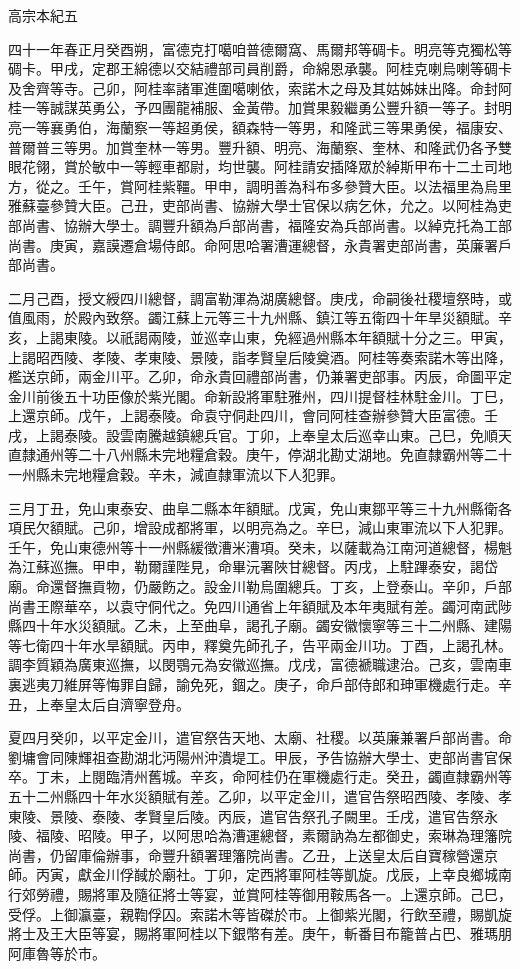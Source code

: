 
\begin{pinyinscope}
高宗本紀五

四十一年春正月癸酉朔，富德克打噶咱普德爾窩、馬爾邦等碉卡。明亮等克獨松等碉卡。甲戌，定郡王綿德以交結禮部司員削爵，命綿恩承襲。阿桂克喇烏喇等碉卡及舍齊等寺。己卯，阿桂率諸軍進圍噶喇依，索諾木之母及其姑姊妹出降。命封阿桂一等誠謀英勇公，予四團龍補服、金黃帶。加賞果毅繼勇公豐升額一等子。封明亮一等襄勇伯，海蘭察一等超勇侯，額森特一等男，和隆武三等果勇侯，福康安、普爾普三等男。加賞奎林一等男。豐升額、明亮、海蘭察、奎林、和隆武仍各予雙眼花翎，賞於敏中一等輕車都尉，均世襲。阿桂請安插降眾於綽斯甲布十二土司地方，從之。壬午，賞阿桂紫韁。甲申，調明善為科布多參贊大臣。以法福里為烏里雅蘇臺參贊大臣。己丑，吏部尚書、協辦大學士官保以病乞休，允之。以阿桂為吏部尚書、協辦大學士。調豐升額為戶部尚書，福隆安為兵部尚書。以綽克托為工部尚書。庚寅，嘉謨遷倉場侍郎。命阿思哈署漕運總督，永貴署吏部尚書，英廉署戶部尚書。

二月己酉，授文綬四川總督，調富勒渾為湖廣總督。庚戌，命嗣後社稷壇祭時，或值風雨，於殿內致祭。蠲江蘇上元等三十九州縣、鎮江等五衛四十年旱災額賦。辛亥，上謁東陵。以祇謁兩陵，並巡幸山東，免經過州縣本年額賦十分之三。甲寅，上謁昭西陵、孝陵、孝東陵、景陵，詣孝賢皇后陵奠酒。阿桂等奏索諾木等出降，檻送京師，兩金川平。乙卯，命永貴回禮部尚書，仍兼署吏部事。丙辰，命圖平定金川前後五十功臣像於紫光閣。命新設將軍駐雅州，四川提督桂林駐金川。丁巳，上還京師。戊午，上謁泰陵。命袁守侗赴四川，會同阿桂查辦參贊大臣富德。壬戌，上謁泰陵。設雲南騰越鎮總兵官。丁卯，上奉皇太后巡幸山東。己巳，免順天直隸通州等二十八州縣未完地糧倉穀。庚午，停湖北勘丈湖地。免直隸霸州等二十一州縣未完地糧倉穀。辛未，減直隸軍流以下人犯罪。

三月丁丑，免山東泰安、曲阜二縣本年額賦。戊寅，免山東鄒平等三十九州縣衛各項民欠額賦。己卯，增設成都將軍，以明亮為之。辛巳，減山東軍流以下人犯罪。壬午，免山東德州等十一州縣緩徵漕米漕項。癸未，以薩載為江南河道總督，楊魁為江蘇巡撫。甲申，勒爾謹陛見，命畢沅署陜甘總督。丙戌，上駐蹕泰安，謁岱廟。命還督撫貢物，仍嚴飭之。設金川勒烏圍總兵。丁亥，上登泰山。辛卯，戶部尚書王際華卒，以袁守侗代之。免四川通省上年額賦及本年夷賦有差。蠲河南武陟縣四十年水災額賦。乙未，上至曲阜，謁孔子廟。蠲安徽懷寧等三十二州縣、建陽等七衛四十年水旱額賦。丙申，釋奠先師孔子，告平兩金川功。丁酉，上謁孔林。調李質穎為廣東巡撫，以閔鶚元為安徽巡撫。戊戌，富德褫職逮治。己亥，雲南車裏逃夷刀維屏等悔罪自歸，諭免死，錮之。庚子，命戶部侍郎和珅軍機處行走。辛丑，上奉皇太后自濟寧登舟。

夏四月癸卯，以平定金川，遣官祭告天地、太廟、社稷。以英廉兼署戶部尚書。命劉墉會同陳輝祖查勘湖北沔陽州沖潰堤工。甲辰，予告協辦大學士、吏部尚書官保卒。丁未，上閱臨清州舊城。辛亥，命阿桂仍在軍機處行走。癸丑，蠲直隸霸州等五十二州縣四十年水災額賦有差。乙卯，以平定金川，遣官告祭昭西陵、孝陵、孝東陵、景陵、泰陵、孝賢皇后陵。丙辰，遣官告祭孔子闕里。壬戌，遣官告祭永陵、福陵、昭陵。甲子，以阿思哈為漕運總督，素爾訥為左都御史，索琳為理籓院尚書，仍留庫倫辦事，命豐升額署理籓院尚書。乙丑，上送皇太后自寶稼營還京師。丙寅，獻金川俘馘於廟社。丁卯，定西將軍阿桂等凱旋。戊辰，上幸良鄉城南行郊勞禮，賜將軍及隨征將士等宴，並賞阿桂等御用鞍馬各一。上還京師。己巳，受俘。上御瀛臺，親鞫俘囚。索諾木等皆磔於市。上御紫光閣，行飲至禮，賜凱旋將士及王大臣等宴，賜將軍阿桂以下銀幣有差。庚午，斬番目布籠普占巴、雅瑪朋阿庫魯等於市。


\end{pinyinscope}
